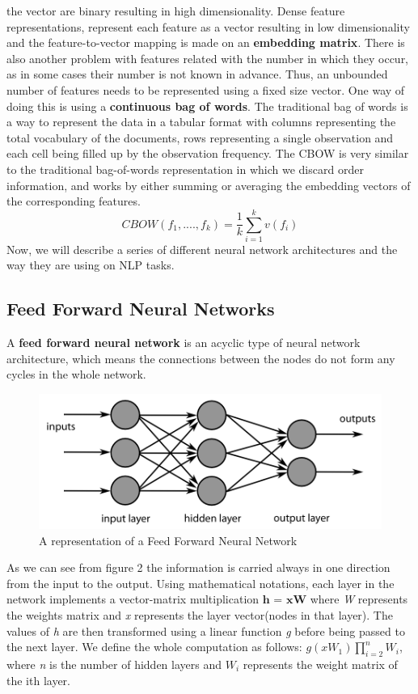 \documentclass{scrartcl}
\begin{document}
    the vector are binary resulting in high dimensionality. Dense feature representations,
    represent each feature as a vector resulting in low dimensionality and the feature-to-vector
    mapping is made on an \textbf{embedding matrix}. 
    There is also another problem with features related with the number in which they occur, as 
    in some cases their number is not known in advance. Thus, an unbounded 
    number of features needs to be represented using a fixed size vector. One way of doing this
    is using a \textbf{continuous bag of words}. The traditional bag of words 
    is a way to represent the data in a tabular format with columns representing the 
    total vocabulary of the documents, rows representing a single observation and each cell
    being filled up by the observation frequency.
    The CBOW is very similar to the traditional bag-of-words representation in which
    we discard order information, and works by either summing or averaging the 
    embedding vectors of the corresponding features.
    \begin{equation}
        CBOW(f_1, ...., f_k) = \frac{1}{k} \sum^{k}_{i=1}v(f_i)
    \end{equation}
    Now, we will describe a series of different neural network architectures and the way they
    are using on NLP tasks.
    \newpage
    \subsection{Feed Forward Neural Networks}
    A \textbf{feed forward neural network} is an acyclic type of neural network architecture, 
    which means the connections between the nodes do not form any cycles in the whole network.
    \begin{figure}[h!]
        \centering
        \includegraphics[scale=0.4]{ffnn.png}
        \caption{A representation of a Feed Forward Neural Network}
    \end{figure} \newline
    As we can see from figure 2 the information is carried always in one direction from the 
    input to the output.
    Using mathematical notations, each layer in the network implements a vector-matrix
    multiplication $\textbf{h = xW}$ where \textit{W} represents the weights matrix and 
    \textit{x} represents the layer vector(nodes in that layer). The values of \textit{h}
    are then transformed using a linear function \textit{g} before being passed to the next layer.
    We define the whole computation as follows: $g(xW_1)\prod^n_{i=2}W_i$, where \textit{n} 
    is the number of hidden layers and \textit{$W_i$} represents the weight matrix of the ith 
    layer.
\end{document}
